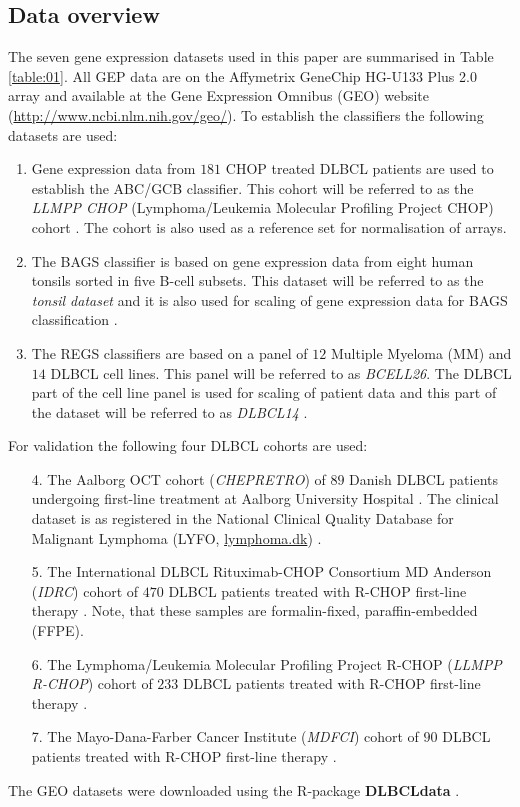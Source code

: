 \documentclass{bmcart}
\newcommand{\R}{\textsf{R}}
\newcommand{\pkg}[1]{\textbf{#1}}
\begin{document}
\subsection{Data overview}
The seven gene expression datasets used in this paper are summarised in Table \ref{table:01}.
All GEP data are on the Affymetrix GeneChip HG-U133 Plus 2.0 array and available at the Gene Expression Omnibus (GEO) \citep{Barrett2013} website (\url{http://www.ncbi.nlm.nih.gov/geo/}).
To establish the classifiers the following datasets are used:
\begin{enumerate}
  \item Gene expression data from $181$ CHOP treated DLBCL patients are used to establish the ABC/GCB classifier.
  This cohort will be referred to as the \emph{LLMPP CHOP} (Lymphoma/Leukemia Molecular Profiling Project CHOP) cohort \citep{Lenz2008a}.
  The cohort is also used as a reference set for normalisation of arrays.
  \item The BAGS classifier is based on gene expression data from eight human tonsils sorted in five B-cell subsets.
  This dataset will be referred to as the \emph{tonsil dataset} and it is also used for scaling of gene expression data for BAGS classification \citep{DybkaerBoegsted2015}.
  \item The REGS classifiers are based on a panel of $12$ Multiple Myeloma (MM) and $14$ DLBCL cell lines.
  This panel will be referred to as \emph{BCELL26}.
  The DLBCL part of the cell line panel is used for scaling of patient data and this part of the dataset will be referred to as   \emph{DLBCL14} \citep{Falgreen2015}.
\end{enumerate}
For validation the following four DLBCL cohorts are used:
\begin{enumerate}
  \item[4.] The Aalborg OCT cohort (\emph{CHEPRETRO}) of $89$ Danish DLBCL patients undergoing first-line treatment at Aalborg University Hospital \citep{DybkaerBoegsted2015}.
  The clinical dataset is as registered in the National Clinical Quality Database for Malignant Lymphoma (LYFO, \url{lymphoma.dk}) \citep{Gang2012}.
  \item[5.] The International DLBCL Rituximab-CHOP Consortium MD Anderson (\emph{IDRC}) cohort of $470$ DLBCL patients treated with R-CHOP first-line therapy \citep{Visco2012}.
  Note, that these samples are formalin-fixed, paraffin-embedded (FFPE).
  \item[6.] The Lymphoma/Leukemia Molecular Profiling Project R-CHOP (\emph{LLMPP R-CHOP}) cohort of $233$ DLBCL patients treated with R-CHOP first-line therapy \citep{Lenz2008a}.
  \item[7.] The Mayo-Dana-Farber Cancer Institute (\emph{MDFCI}) cohort of $90$ DLBCL patients treated with R-CHOP first-line therapy \citep{Monti2012a}.
\end{enumerate}
The GEO datasets were downloaded using the \R{}-package \pkg{DLBCLdata} \citep{DLBCLdata}.
\end{document}
